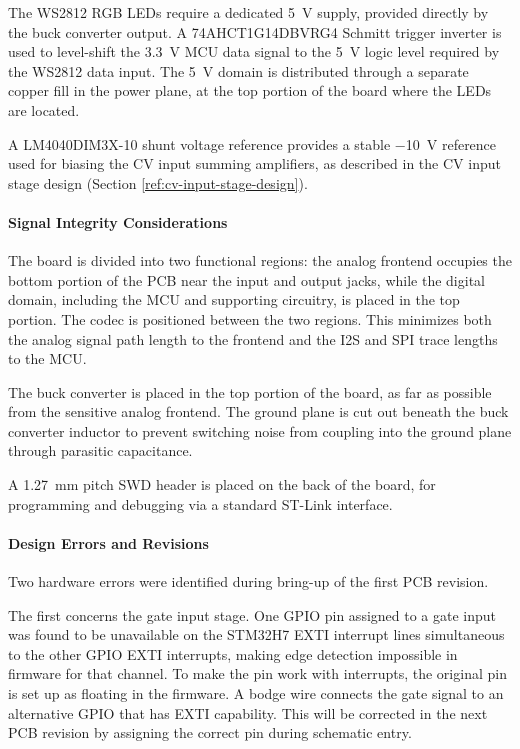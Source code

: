 The WS2812 RGB LEDs require a dedicated \qty{5}{\volt} supply, provided directly by the buck converter output.
A 74AHCT1G14DBVRG4 Schmitt trigger inverter is used to level-shift the \qty{3.3}{\volt} MCU data signal to the \qty{5}{\volt} logic level required by the WS2812 data input.
The \qty{5}{\volt} domain is distributed through a separate copper fill in the power plane, at the top portion of the board where the LEDs are located.

A LM4040DIM3X-10 shunt voltage reference provides a stable \qty{-10}{\volt} reference used for biasing the CV input summing amplifiers, as described in the CV input stage design (Section \ref{ref:cv-input-stage-design}).

\paragraph{Signal Integrity Considerations}

The board is divided into two functional regions: the analog frontend occupies the bottom portion of the PCB near the input and output jacks, while the digital domain, including the MCU and supporting circuitry, is placed in the top portion.
The codec is positioned between the two regions. 
This minimizes both the analog signal path length to the frontend and the I2S and SPI trace lengths to the MCU.

The buck converter is placed in the top portion of the board, as far as possible from the sensitive analog frontend.
The ground plane is cut out beneath the buck converter inductor to prevent switching noise from coupling into the ground plane through parasitic capacitance.

A \qty{1.27}{\milli\meter} pitch SWD header is placed on the back of the board, for programming and debugging via a standard ST-Link interface.

\paragraph{Design Errors and Revisions}

Two hardware errors were identified during bring-up of the first PCB revision.

The first concerns the gate input stage.
One GPIO pin assigned to a gate input was found to be unavailable on the STM32H7 \ac{EXTI} interrupt lines simultaneous to the other GPIO EXTI interrupts, making edge detection impossible in firmware for that channel.
To make the pin work with interrupts, the original pin is set up as floating in the firmware. A bodge wire connects the gate signal to an alternative GPIO that has EXTI capability.
This will be corrected in the next PCB revision by assigning the correct pin during schematic entry.

